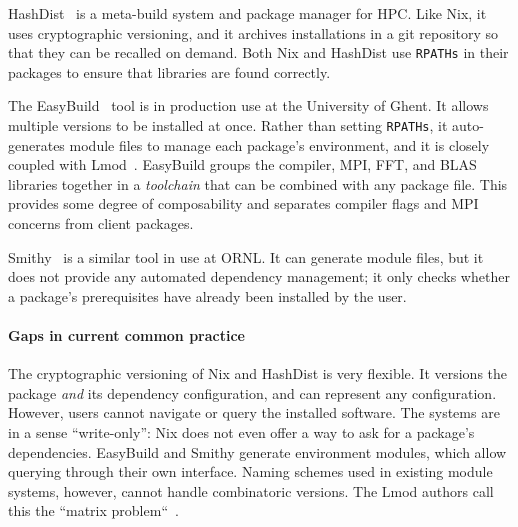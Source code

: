 HashDist~\cite{hashdist} is a meta-build system and package manager for HPC.
Like Nix, it uses cryptographic versioning, and it archives installations
in a git repository so that they can be recalled on demand. 
%
Both Nix and HashDist use {\tt RPATHs} in their packages to ensure that
libraries are found correctly. 

The EasyBuild~\cite{hoste+:pyhpc12} tool is in production use at
the University of Ghent.  It allows multiple versions to be installed
at once.  Rather than setting {\tt RPATHs}, it auto-generates module files
to manage each package's environment, and it is closely coupled with 
Lmod~\cite{geimer+:hust14}.  EasyBuild groups the compiler, MPI, FFT, and
BLAS libraries together in a {\it toolchain} that can be combined with
any package file. This provides some degree of composability and
separates compiler flags and MPI concerns from client packages.

Smithy~\cite{digirolamo:smithy} is a similar tool in use at ORNL. It
can generate module files, but it does not provide any 
automated dependency management; it only checks whether a package's
prerequisites have already been installed by the user.

\paragraph{Gaps in current common practice}
The cryptographic versioning of Nix and HashDist is very flexible. It versions
the package {\it and} its dependency configuration, and can represent any
configuration. However, users cannot navigate or query the installed software.
The systems are in a sense ``write-only'':
Nix does not even offer a way to ask for a package's dependencies.
%
EasyBuild and Smithy generate environment modules, which allow querying
through their own interface. Naming schemes used in existing module systems, however, cannot
handle combinatoric versions. The Lmod authors call this the
``matrix problem``~\cite{mclay:lmod-tutorial}.



